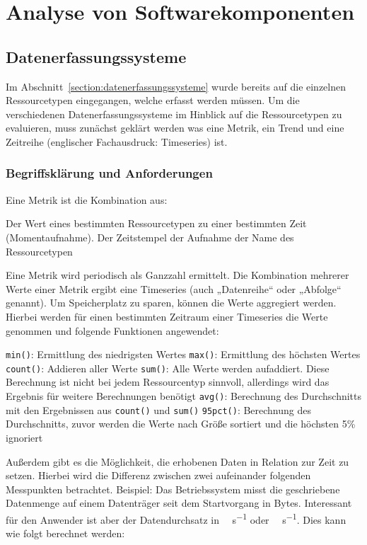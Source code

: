 \chapter{Analyse von Softwarekomponenten}
\section{Datenerfassungssysteme}
Im Abschnitt~\ref{section:datenerfassungssysteme} wurde bereits auf die
einzelnen Ressourcetypen eingegangen, welche erfasst werden müssen. Um die
verschiedenen Datenerfassungssysteme im Hinblick auf die Ressourcetypen zu
evaluieren, muss zunächst geklärt werden was eine Metrik, ein Trend und eine
Zeitreihe (englischer Fachausdruck: Timeseries) ist.
\tm%

\subsection{Begriffsklärung und Anforderungen}
\label{section:Begriffserklärung}
Eine Metrik ist die Kombination aus:

\begin{outline}
  \1 Der Wert eines bestimmten Ressourcetypen zu einer bestimmten Zeit
  (Momentaufnahme).
  \1 Der Zeitstempel der Aufnahme
  \1 der Name des Ressourcetypen
\end{outline}

Eine Metrik wird periodisch als Ganzzahl ermittelt. Die Kombination mehrerer
Werte einer Metrik ergibt eine Timeseries (auch „Datenreihe“ oder „Abfolge“
genannt). Um Speicherplatz zu sparen, können die Werte aggregiert werden.
Hierbei werden für einen bestimmten Zeitraum einer Timeseries die Werte
genommen und folgende Funktionen angewendet:

\begin{outline}
  \1 \lstinline|min()|: Ermittlung des niedrigsten Wertes
  \1 \lstinline|max()|: Ermittlung des höchsten Wertes
  \1 \lstinline|count()|: Addieren aller Werte
  \1 \lstinline|sum()|: Alle Werte werden aufaddiert. Diese Berechnung ist
  nicht bei jedem Ressourcentyp sinnvoll, allerdings wird das Ergebnis für
  weitere Berechnungen benötigt
  \1 \lstinline|avg()|: Berechnung des Durchschnitts mit den Ergebnissen aus
  \lstinline|count()| und \lstinline|sum()|
  \1 \lstinline|95pct()|: Berechnung des Durchschnitts, zuvor werden die Werte
  nach Größe sortiert und die höchsten 5\% ignoriert
\end{outline}

Außerdem gibt es die Möglichkeit, die erhobenen Daten in Relation zur Zeit zu
setzen. Hierbei wird die Differenz zwischen zwei aufeinander folgenden
Messpunkten betrachtet.  Beispiel: Das Betriebssystem misst die geschriebene
Datenmenge auf einem Datenträger seit dem Startvorgang in Bytes. Interessant
für den Anwender ist aber der Datendurchsatz in \si{\mega\byte\per\second} oder
\si{\giga\byte\per\second}. Dies kann wie folgt berechnet werden:

